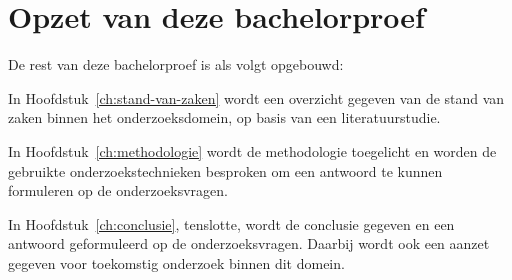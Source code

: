 \section{Opzet van deze bachelorproef}
\label{sec:opzet-bachelorproef}


De rest van deze bachelorproef is als volgt opgebouwd:

In Hoofdstuk~\ref{ch:stand-van-zaken} wordt een overzicht gegeven van de stand van zaken binnen het onderzoeksdomein, op basis van een literatuurstudie.

In Hoofdstuk~\ref{ch:methodologie} wordt de methodologie toegelicht en worden de gebruikte onderzoekstechnieken besproken om een antwoord te kunnen formuleren op de onderzoeksvragen.


In Hoofdstuk~\ref{ch:conclusie}, tenslotte, wordt de conclusie gegeven en een antwoord geformuleerd op de onderzoeksvragen. Daarbij wordt ook een aanzet gegeven voor toekomstig onderzoek binnen dit domein.

